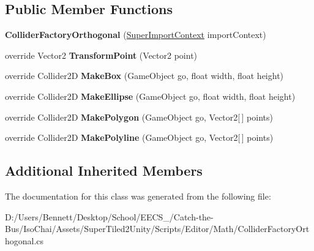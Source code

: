 \subsection*{Public Member Functions}
\begin{DoxyCompactItemize}
\item 
\mbox{\label{class_super_tiled2_unity_1_1_editor_1_1_collider_factory_orthogonal_ae876b353714bbcde2db70fa9207f9c87}} 
{\bfseries Collider\+Factory\+Orthogonal} (\mbox{\hyperlink{class_super_tiled2_unity_1_1_editor_1_1_super_import_context}{Super\+Import\+Context}} import\+Context)
\item 
\mbox{\label{class_super_tiled2_unity_1_1_editor_1_1_collider_factory_orthogonal_af4f6adc8c6c7412fca90a5947dd98e84}} 
override Vector2 {\bfseries Transform\+Point} (Vector2 point)
\item 
\mbox{\label{class_super_tiled2_unity_1_1_editor_1_1_collider_factory_orthogonal_ab1ab6988dce181c20080ecddd14f90d9}} 
override Collider2D {\bfseries Make\+Box} (Game\+Object go, float width, float height)
\item 
\mbox{\label{class_super_tiled2_unity_1_1_editor_1_1_collider_factory_orthogonal_ac8c22f36ffe64e5022cd16376722baa7}} 
override Collider2D {\bfseries Make\+Ellipse} (Game\+Object go, float width, float height)
\item 
\mbox{\label{class_super_tiled2_unity_1_1_editor_1_1_collider_factory_orthogonal_af8185d18cfae7d2e78996fa9e9ca3573}} 
override Collider2D {\bfseries Make\+Polygon} (Game\+Object go, Vector2\mbox{[}$\,$\mbox{]} points)
\item 
\mbox{\label{class_super_tiled2_unity_1_1_editor_1_1_collider_factory_orthogonal_ac486ad7a7af58cc58ee9c30e9495b53f}} 
override Collider2D {\bfseries Make\+Polyline} (Game\+Object go, Vector2\mbox{[}$\,$\mbox{]} points)
\end{DoxyCompactItemize}
\subsection*{Additional Inherited Members}


The documentation for this class was generated from the following file\+:\begin{DoxyCompactItemize}
\item 
D\+:/\+Users/\+Bennett/\+Desktop/\+School/\+E\+E\+C\+S\+\_/\+Catch-\/the-\/\+Bus/\+Iso\+Chai/\+Assets/\+Super\+Tiled2\+Unity/\+Scripts/\+Editor/\+Math/Collider\+Factory\+Orthogonal.\+cs\end{DoxyCompactItemize}
